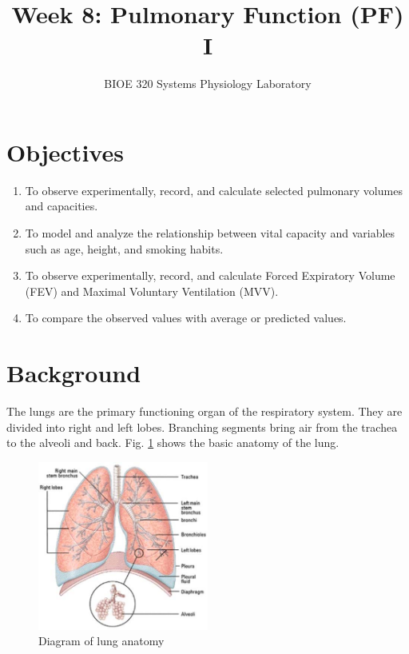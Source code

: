 \documentclass{article}
\title{Week 8: Pulmonary Function (PF) I}
\author{BIOE 320 Systems Physiology Laboratory}
\date{}
\begin{document}
\large
\maketitle

\section*{Objectives}
\begin{enumerate}
	\item To observe experimentally, record, and calculate selected pulmonary volumes and capacities.
	\item To model and analyze the relationship between vital capacity and variables such as age, height, and smoking habits.
	\item To observe experimentally, record, and calculate Forced Expiratory Volume (FEV) and Maximal Voluntary Ventilation (MVV).
	\item To compare the observed values with average or predicted values.
\end{enumerate}

\section*{Background}

The lungs are the primary functioning organ of the respiratory system. They are divided into right and left lobes. Branching segments bring air from the trachea to the alveoli and back. Fig. \ref{lung} shows the basic anatomy of the lung.

\begin{figure}[h]
\centering\includegraphics[width=0.5\textwidth]{../images/PF_I_1.jpg}
\caption{Diagram of lung anatomy}
\label{lung}
\end{figure}
\end{document}
